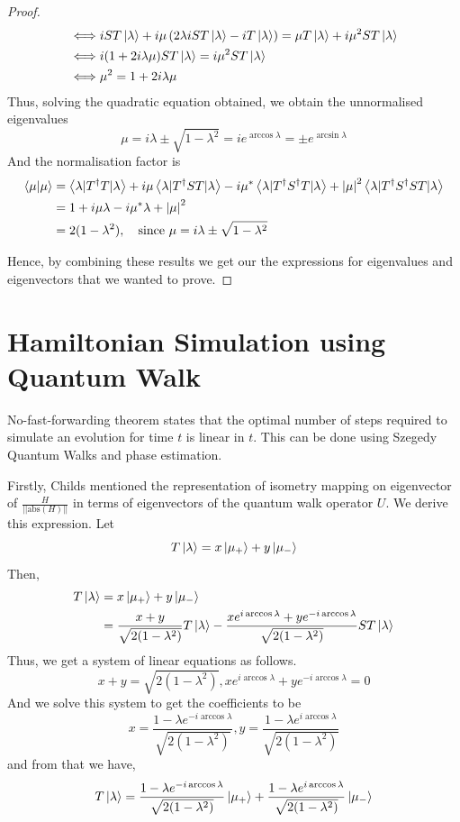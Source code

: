 \documentclass[
10pt, %
a4paper, %
oneside, %
headinclude,footinclude, %
BCOR5mm, %
]{scrartcl}
\begin{document}
\begin{proof}
\begin{align*}
&\Longleftrightarrow iST\ket\lambda+i\mu\left(2\lambda iST\ket\lambda-iT\ket\lambda\right)=\mu T\ket\lambda+i\mu^2ST\ket\lambda\\
&\Longleftrightarrow i(1+2i\lambda\mu)ST\ket\lambda=i\mu^2ST\ket\lambda\\
&\Longleftrightarrow \mu^2=1+2i\lambda\mu
\end{align*}
Thus, solving the quadratic equation obtained, we obtain the unnormalised eigenvalues
$$\mu=i\lambda\pm\sqrt{1-\lambda^2}=ie^{\arccos\lambda}=\pm e^{\arcsin\lambda}$$
And the normalisation factor is
\begin{align*}
\braket{\mu}{\mu}&=\left<\lambda|T^{\dagger}T|\lambda\right>+i\mu\left<\lambda|T^{\dagger}ST|\lambda\right>-i\mu^*\left<\lambda|T^{\dagger}S^{\dagger}T|\lambda\right>+\abs{\mu}^2\left<\lambda|T^{\dagger}S^{\dagger}ST|\lambda\right>\\
&=1+i\mu\lambda-i\mu^*\lambda+\abs{\mu}^2\\
&=2(1-\lambda^2),\ \ \ \text{since }\mu=i\lambda\pm\sqrt{1-\lambda^2}
\end{align*}

Hence, by combining these results we get our the expressions for eigenvalues and eigenvectors that we wanted to prove.
\end{proof}

\section{Hamiltonian Simulation using Quantum Walk}

No-fast-forwarding theorem states that the optimal number of steps required to simulate an evolution for time $t$ is linear in $t$. This can be done using Szegedy Quantum Walks and phase estimation.

Firstly, Childs mentioned the representation of isometry mapping on eigenvector of $\frac{H}{||\text{abs}(H)||}$ in terms of eigenvectors of the quantum walk operator $U$. We derive this expression. Let
$$T\ket\lambda=x\ket{\mu_+}+y\ket{\mu_-}$$
Then,
\begin{align*}
T\ket\lambda&=x\ket{\mu_+}+y\ket{\mu_-}\\
&=\frac{x+y}{\sqrt{2(1-\lambda^2)}}T\ket\lambda-\frac{xe^{i\arccos\lambda}+ye^{-i\arccos\lambda}}{\sqrt{2(1-\lambda^2)}}ST\ket\lambda
\end{align*}
Thus, we get a system of linear equations as follows.
$$x+y=\sqrt{2(1-\lambda^2)},xe^{i\arccos\lambda}+ye^{-i\arccos\lambda}=0$$
And we solve this system to get the coefficients to be
$$x=\frac{1-\lambda e^{-i\arccos\lambda}}{\sqrt{2(1-\lambda^2)}},y=\frac{1-\lambda e^{i\arccos\lambda}}{\sqrt{2(1-\lambda^2)}}$$
and from that we have,
$$T\ket\lambda=\frac{1-\lambda e^{-i\arccos\lambda}}{\sqrt{2(1-\lambda^2)}}\ket{\mu_+}+\frac{1-\lambda e^{i\arccos\lambda}}{\sqrt{2(1-\lambda^2)}}\ket{\mu_-}$$
\end{document}
